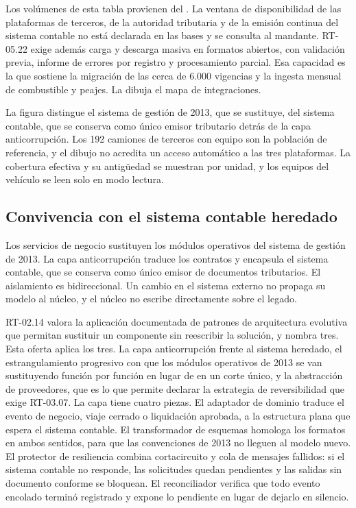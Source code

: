 Los volúmenes de esta tabla provienen del . La ventana de disponibilidad de las
plataformas de terceros, de la autoridad tributaria y de la emisión continua del sistema contable no
está declarada en las bases y se consulta al mandante. RT-05.22 exige además carga y descarga masiva en
formatos abiertos, con validación previa, informe de errores por registro y procesamiento parcial. Esa
capacidad es la que sostiene la migración de las cerca de 6.000 vigencias y la ingesta mensual de
combustible y peajes. La  dibuja el mapa de integraciones.


La figura distingue el sistema de gestión de 2013, que se sustituye, del sistema contable, que se
conserva como único emisor tributario detrás de la capa anticorrupción. Los 192 camiones de terceros
con equipo son la población de referencia, y el dibujo no acredita un acceso automático a las tres
plataformas. La cobertura efectiva y su antigüedad se muestran por unidad, y los equipos del vehículo
se leen solo en modo lectura.

\subsection{Convivencia con el sistema contable heredado}\label{sec:4-contable}

Los servicios de negocio sustituyen los módulos operativos del sistema de gestión de 2013. La capa
anticorrupción traduce los contratos y encapsula el sistema contable, que se conserva como único
emisor de documentos tributarios. El aislamiento es bidireccional. Un cambio en el sistema externo no
propaga su modelo al núcleo, y el núcleo no escribe directamente sobre el legado.

RT-02.14 valora la aplicación documentada de patrones de arquitectura evolutiva que permitan
sustituir un componente sin reescribir la solución, y nombra tres. Esta oferta aplica los tres. La capa
anticorrupción frente al sistema heredado, el estrangulamiento progresivo con que los módulos
operativos de 2013 se van sustituyendo función por función en lugar de en un corte único, y la
abstracción de proveedores, que es lo que permite declarar la estrategia de reversibilidad que exige
RT-03.07. La capa tiene cuatro piezas. El adaptador de dominio traduce el evento de negocio, viaje
cerrado o liquidación aprobada, a la estructura plana que espera el sistema contable. El transformador
de esquemas homologa los formatos en ambos sentidos, para que las convenciones de 2013 no lleguen al
modelo nuevo. El protector de resiliencia combina cortacircuito y cola de mensajes fallidos: si el
sistema contable no responde, las solicitudes quedan pendientes y las salidas sin documento conforme se
bloquean. El reconciliador verifica que todo evento encolado terminó registrado y expone lo pendiente en
lugar de dejarlo en silencio.

